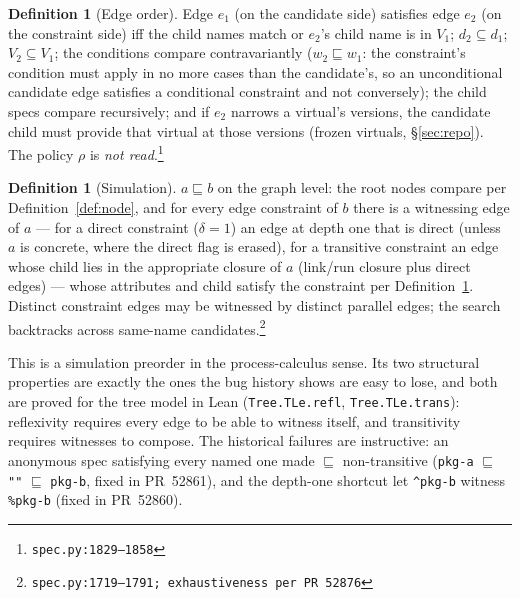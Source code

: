 \documentclass[11pt]{article}
\theoremstyle{definition}
\newtheorem{definition}[theorem]{Definition}
\theoremstyle{remark}
\newcommand{\sat}{\sqsubseteq}
\newcommand{\code}[1]{\texttt{#1}}
\newcommand{\src}[1]{\footnote{\code{#1}}}
\begin{document}
\begin{definition}[Edge order]\label{def:edgeorder}
Edge $e_1$ (on the candidate side) satisfies edge $e_2$ (on the constraint
side) iff the child names match or $e_2$'s child name is in $V_1$; $d_2
\subseteq d_1$; $V_2 \subseteq V_1$; the conditions compare contravariantly
($w_2 \sat w_1$: the constraint's condition must apply in no more cases than
the candidate's, so an unconditional candidate edge satisfies a conditional
constraint and not conversely); the
child specs compare recursively; and if $e_2$ narrows a virtual's versions,
the candidate child must provide that virtual at those versions (frozen
virtuals, \S\ref{sec:repo}).  The policy $\rho$ is \emph{not
read}.\src{spec.py:1829--1858}
\end{definition}

\begin{definition}[Simulation]\label{def:simulation}
$a \sat b$ on the graph level: the root nodes compare per
Definition~\ref{def:node}, and for every edge constraint of $b$ there is a
witnessing edge of $a$ --- for a direct constraint ($\delta = 1$) an edge at
depth one that is direct (unless $a$ is concrete, where the direct flag is
erased), for a transitive constraint an edge whose child lies in the
appropriate closure of $a$ (link/run closure plus direct edges) --- whose
attributes and child satisfy the constraint per
Definition~\ref{def:edgeorder}.  Distinct constraint edges may be witnessed by
distinct parallel edges; the search backtracks across same-name
candidates.\src{spec.py:1719--1791; exhaustiveness per PR~52876}
\end{definition}

This is a simulation preorder in the process-calculus sense.  Its two
structural properties are exactly the ones the bug history shows are easy to
lose, and both are proved for the tree model in Lean
(\code{Tree.TLe.refl}, \code{Tree.TLe.trans}): reflexivity requires every edge
to be able to witness itself, and transitivity requires witnesses to compose.
The historical failures are instructive: an anonymous spec satisfying every
named one made $\sat$ non-transitive (\code{pkg-a} $\sat$ \code{""} $\sat$
\code{pkg-b}, fixed in PR~52861), and the depth-one shortcut let
\code{\^{}pkg-b} witness \code{\%pkg-b} (fixed in PR~52860).
\end{document}
